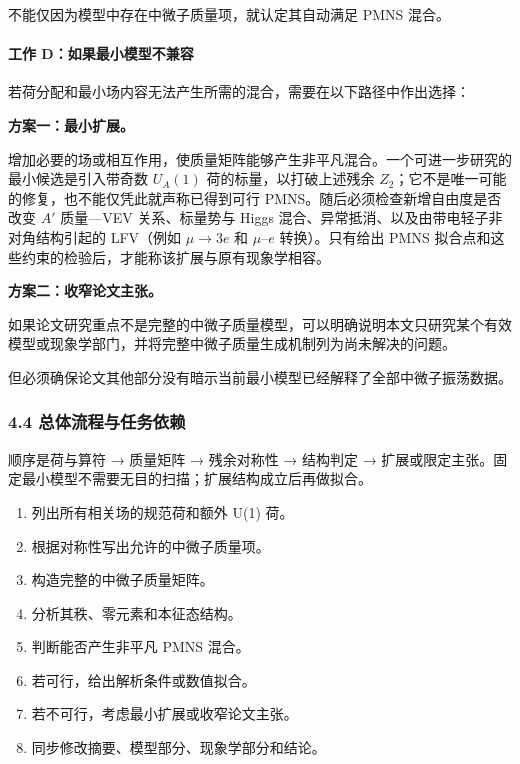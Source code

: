 \documentclass[
]{article}
\providecommand{\tightlist}{%
  \setlength{\itemsep}{0pt}\setlength{\parskip}{0pt}}
\begin{document}
不能仅因为模型中存在中微子质量项，就认定其自动满足 PMNS 混合。

\paragraph{工作
D：如果最小模型不兼容}\label{ux5de5ux4f5c-dux5982ux679cux6700ux5c0fux6a21ux578bux4e0dux517cux5bb9}

若荷分配和最小场内容无法产生所需的混合，需要在以下路径中作出选择：

\textbf{方案一：最小扩展。}

增加必要的场或相互作用，使质量矩阵能够产生非平凡混合。一个可进一步研究的最小候选是引入带奇数
\(U_A(1)\) 荷的标量，以打破上述残余
\(Z_2\)；它不是唯一可能的修复，也不能仅凭此就声称已得到可行
PMNS。随后必须检查新增自由度是否改变 \(A'\) 质量---VEV 关系、标量势与
Higgs 混合、异常抵消、以及由带电轻子非对角结构引起的 LFV（例如
\(\mu\to3e\) 和 \(\mu\)--\(e\) 转换）。只有给出 PMNS
拟合点和这些约束的检验后，才能称该扩展与原有现象学相容。

\textbf{方案二：收窄论文主张。}

如果论文研究重点不是完整的中微子质量模型，可以明确说明本文只研究某个有效模型或现象学部门，并将完整中微子质量生成机制列为尚未解决的问题。

但必须确保论文其他部分没有暗示当前最小模型已经解释了全部中微子振荡数据。

\subsubsection{4.4
总体流程与任务依赖}\label{ux603bux4f53ux6d41ux7a0bux4e0eux4efbux52a1ux4f9dux8d56-2}

顺序是荷与算符 → 质量矩阵 → 残余对称性 → 结构判定 →
扩展或限定主张。固定最小模型不需要无目的扫描；扩展结构成立后再做拟合。

\begin{enumerate}
\def\labelenumi{\arabic{enumi}.}
\tightlist
\item
  列出所有相关场的规范荷和额外 U(1) 荷。
\item
  根据对称性写出允许的中微子质量项。
\item
  构造完整的中微子质量矩阵。
\item
  分析其秩、零元素和本征态结构。
\item
  判断能否产生非平凡 PMNS 混合。
\item
  若可行，给出解析条件或数值拟合。
\item
  若不可行，考虑最小扩展或收窄论文主张。
\item
  同步修改摘要、模型部分、现象学部分和结论。
\end{enumerate}
\end{document}
